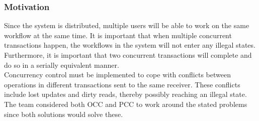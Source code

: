 \subsubsection{Motivation}
Since the system is distributed, multiple users will be able to work on the same workflow at the same time. It is important that when multiple concurrent transactions happen, the workflows in the system will not enter any illegal states. Furthermore, it is important that two concurrent transactions will complete and do so in a serially equivalent manner. \\

Concurrency control must be implemented to cope with conflicts between operations in different transactions sent to the same receiver. These conflicts include lost updates and dirty reads, thereby possibly reaching an illegal state. \\

The team considered both OCC and PCC to work around the stated problems since both solutions would solve these.